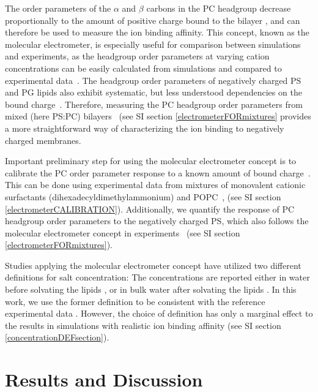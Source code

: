\documentclass[aps,prl,superscriptaddress,twocolumn]{revtex4}
\begin{document}
The order parameters of the $\alpha$ and $\beta$ carbons in the PC headgroup
decrease proportionally to the amount of positive
charge bound to the bilayer \cite{akutsu81,altenbach84,seelig87},
and can therefore be used to measure the ion binding affinity.
This concept, known as the molecular electrometer, is especially useful for 
comparison between simulations and experiments, as
the headgroup order parameters at varying cation
concentrations can be easily calculated from
simulations and compared to experimental data~\cite{catte16}. The headgroup order parameters
of negatively charged PS and PG lipids also exhibit systematic, but less
understood dependencies on the bound charge~\cite{borle85,macdonald87,roux86,roux90}.
Therefore, measuring the PC headgroup order parameters from 
mixed (here PS:PC) bilayers~\cite{roux86,roux90,roux91} (see SI section \ref{electrometerFORmixtures} provides a more straightforward way of characterizing the ion binding to negatively charged membranes.

Important preliminary step for using the molecular electrometer concept is to calibrate the PC order parameter response to a known amount of bound charge~\cite{catte16,melcr18}.
This can be done using experimental data from mixtures of
monovalent cationic surfactants (dihexadecyldimethylammonium) and POPC~\cite{scherer89,melcr18},
(see SI section \ref{electrometerCALIBRATION}). Additionally, we quantify the response of PC headgroup order parameters
to the negatively charged PS, which also follows the molecular electrometer
concept in experiments~\cite{scherer87} (see SI section \ref{electrometerFORmixtures}).

Studies applying the molecular electrometer concept have utilized two different definitions for salt concentration:
The concentrations are reported either in water before solvating the lipids \cite{akutsu81,roux90,catte16},
or in bulk water after solvating the lipids \cite{altenbach84,melcr18}.
In this work, we use the former definition to be consistent with the reference
experimental data \cite{roux90}. However, the choice of definition has only a marginal effect
to the results in simulations with realistic ion binding affinity
(see SI section \ref{concentrationDEFsection}).

\section{Results and Discussion}
\end{document}
